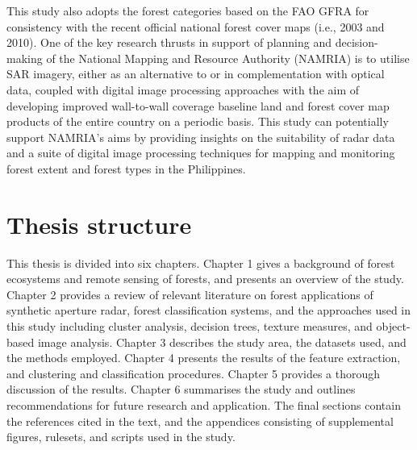 This study also adopts the forest categories based on the FAO GFRA for consistency with the recent official national forest cover maps (i.e., 2003 and 2010). One of the key research thrusts in support of planning and decision-making of the National Mapping and Resource Authority (NAMRIA) is to utilise SAR imagery, either as an alternative to or in complementation with optical data, coupled with digital image processing approaches with the aim of developing improved wall-to-wall coverage baseline land and forest cover map products of the entire country on a periodic basis. This study can potentially support NAMRIA's aims by providing insights on the suitability of radar data and a suite of digital image processing techniques for mapping and monitoring forest extent and forest types in the Philippines.

\section{Thesis structure}
\label{sec: intro-thesis-structure}

This thesis is divided into six chapters. Chapter 1 gives a background of forest ecosystems and remote sensing of forests, and presents an overview of the study. Chapter 2 provides a review of relevant literature on forest applications of synthetic aperture radar, forest classification systems, and the approaches used in this study including cluster analysis, decision trees, texture measures, and object-based image analysis. Chapter 3 describes the study area, the datasets used, and the methods employed. Chapter 4 presents the results of the feature extraction, and clustering and classification procedures. Chapter 5 provides a thorough discussion of the results. Chapter 6 summarises the study and outlines recommendations for future research and application. The final sections contain the references cited in the text, and the appendices consisting of supplemental figures, rulesets, and scripts used in the study.
